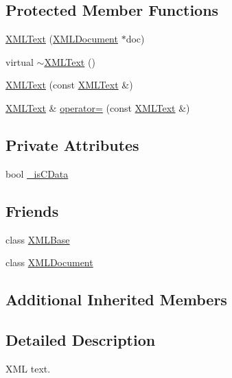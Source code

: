 \subsection*{Protected Member Functions}
\begin{DoxyCompactItemize}
\item 
\hyperlink{classtinyxml2_1_1_x_m_l_text_ad9f46d70e61e5386ead93728d8b90267}{X\-M\-L\-Text} (\hyperlink{classtinyxml2_1_1_x_m_l_document}{X\-M\-L\-Document} $\ast$doc)
\item 
virtual \hyperlink{classtinyxml2_1_1_x_m_l_text_ae9b8790d0dc13914394dbd7437c0e59d}{$\sim$\-X\-M\-L\-Text} ()
\item 
\hyperlink{classtinyxml2_1_1_x_m_l_text_a002156e1f61ee6d48e5368b7cca25582}{X\-M\-L\-Text} (const \hyperlink{classtinyxml2_1_1_x_m_l_text}{X\-M\-L\-Text} \&)
\item 
\hyperlink{classtinyxml2_1_1_x_m_l_text}{X\-M\-L\-Text} \& \hyperlink{classtinyxml2_1_1_x_m_l_text_ad8c9f398d92fa472e213b89d8483ae8f}{operator=} (const \hyperlink{classtinyxml2_1_1_x_m_l_text}{X\-M\-L\-Text} \&)
\end{DoxyCompactItemize}
\subsection*{Private Attributes}
\begin{DoxyCompactItemize}
\item 
bool \hyperlink{classtinyxml2_1_1_x_m_l_text_aae1a8b4117e8c8bb107900a0560d5ab5}{\-\_\-is\-C\-Data}
\end{DoxyCompactItemize}
\subsection*{Friends}
\begin{DoxyCompactItemize}
\item 
class \hyperlink{classtinyxml2_1_1_x_m_l_text_a449202cfc89e7ae5c2f81995476f9ec1}{X\-M\-L\-Base}
\item 
class \hyperlink{classtinyxml2_1_1_x_m_l_text_a4eee3bda60c60a30e4e8cd4ea91c4c6e}{X\-M\-L\-Document}
\end{DoxyCompactItemize}
\subsection*{Additional Inherited Members}


\subsection{Detailed Description}
X\-M\-L text.

